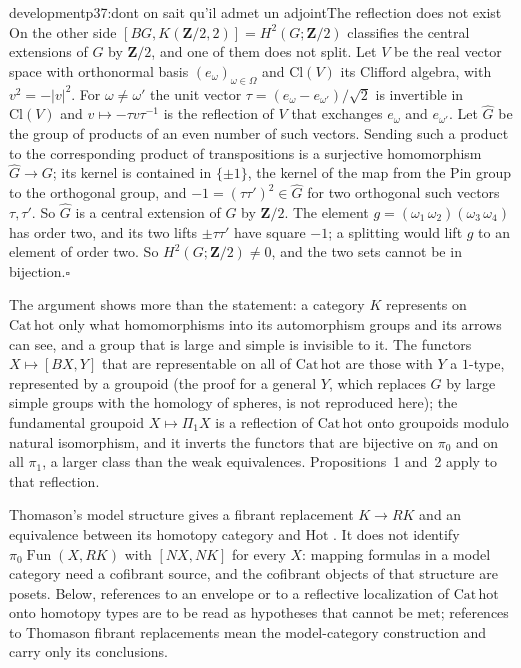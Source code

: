 \begin{dcomment}{development}{p37:dont on sait qu'il admet un adjoint}{The reflection does not exist}
On the other side $[BG,K(\mathbf Z/2,2)]=H^2(G;\mathbf Z/2)$ classifies the central extensions of $G$ by $\mathbf Z/2$, and one of them does not split. Let $V$ be the real vector space with orthonormal basis $(e_\omega)_{\omega\in\Omega}$ and $\mathrm{Cl}(V)$ its Clifford algebra, with $v^2=-|v|^2$. For $\omega\neq\omega'$ the unit vector $\tau=(e_\omega-e_{\omega'})/\sqrt2$ is invertible in $\mathrm{Cl}(V)$ and $v\mapsto-\tau v\tau^{-1}$ is the reflection of $V$ that exchanges $e_\omega$ and $e_{\omega'}$. Let $\widehat G$ be the group of products of an even number of such vectors. Sending such a product to the corresponding product of transpositions is a surjective homomorphism $\widehat G\to G$; its kernel is contained in $\{\pm1\}$, the kernel of the map from the Pin group to the orthogonal group, and $-1=(\tau\tau')^2\in\widehat G$ for two orthogonal such vectors $\tau,\tau'$. So $\widehat G$ is a central extension of $G$ by $\mathbf Z/2$. The element $g=(\omega_1\,\omega_2)(\omega_3\,\omega_4)$ has order two, and its two lifts $\pm\tau\tau'$ have square $-1$; a splitting would lift $g$ to an element of order two. So $H^2(G;\mathbf Z/2)\neq0$, and the two sets cannot be in bijection.\hfill$\square$

The argument shows more than the statement: a category $K$ represents on $\mathrm{Cat}\,\mathrm{hot}$ only what homomorphisms into its automorphism groups and its arrows can see, and a group that is large and simple is invisible to it. The functors $X\mapsto[BX,Y]$ that are representable on all of $\mathrm{Cat}\,\mathrm{hot}$ are those with $Y$ a $1$-type, represented by a groupoid (the proof for a general $Y$, which replaces $G$ by large simple groups with the homology of spheres, is not reproduced here); the fundamental groupoid $X\mapsto\Pi_1X$ is a reflection of $\mathrm{Cat}\,\mathrm{hot}$ onto groupoids modulo natural isomorphism, and it inverts the functors that are bijective on $\pi_0$ and on all $\pi_1$, a larger class than the weak equivalences. Propositions~1 and~2 apply to that reflection.

Thomason's model structure gives a fibrant replacement $K\to RK$ and an equivalence between its homotopy category and $\mathrm{Hot}$ \citep[Theorem~4.9 and Corollary~5.5]{Thomason1980}. It does not identify $\pi_0\operatorname{Fun}(X,RK)$ with $[NX,NK]$ for every $X$: mapping formulas in a model category need a cofibrant source, and the cofibrant objects of that structure are posets. Below, references to an envelope or to a reflective localization of $\mathrm{Cat}\,\mathrm{hot}$ onto homotopy types are to be read as hypotheses that cannot be met; references to Thomason fibrant replacements mean the model-category construction and carry only its conclusions.
\end{dcomment}


